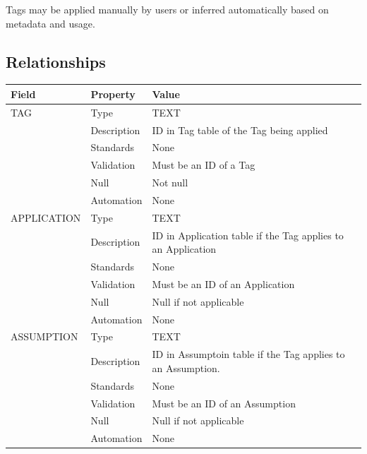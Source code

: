 Tags may be applied manually by users or inferred automatically based on
metadata and usage.

\subsection{Relationships}\label{relationships-29}

\begin{longtable}[]{@{}
  >{\raggedright\arraybackslash}p{}
  >{\raggedright\arraybackslash}p{}
  >{\raggedright\arraybackslash}p{}@{}}
\toprule\noalign{}
\begin{minipage}[b]{\linewidth}\raggedright
Field
\end{minipage} & \begin{minipage}[b]{\linewidth}\raggedright
Property
\end{minipage} & \begin{minipage}[b]{\linewidth}\raggedright
Value
\end{minipage} \\
\midrule\noalign{}
\endhead
\bottomrule\noalign{}
\endlastfoot
TAG & Type & TEXT \\
& Description & ID in Tag table of the Tag being applied \\
& Standards & None \\
& Validation & Must be an ID of a Tag \\
& Null & Not null \\
& Automation & None \\
APPLICATION & Type & TEXT \\
& Description & ID in Application table if the Tag applies to an
Application \\
& Standards & None \\
& Validation & Must be an ID of an Application \\
& Null & Null if not applicable \\
& Automation & None \\
ASSUMPTION & Type & TEXT \\
& Description & ID in Assumptoin table if the Tag applies to an
Assumption. \\
& Standards & None \\
& Validation & Must be an ID of an Assumption \\
& Null & Null if not applicable \\
& Automation & None \\

\end{longtable}
